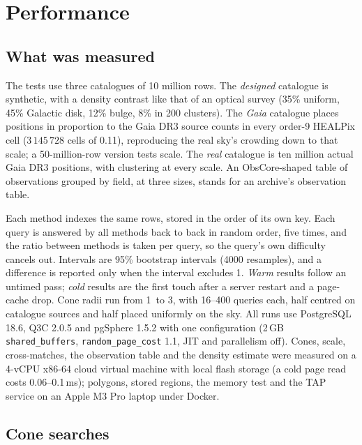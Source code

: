 \section{Performance}
\label{sec:tests}

\subsection{What was measured}
\label{sec:corpora}
\label{sec:protocol}

The tests use three catalogues of 10 million rows. The \emph{designed} catalogue is synthetic, with a density contrast like that of an
optical survey (35\% uniform, 45\% Galactic disk, 12\% bulge, 8\% in 200 clusters). The
\emph{Gaia} catalogue places positions in proportion to the Gaia DR3 source counts in
every order-9 HEALPix cell ($3\,145\,728$ cells of 0.11\degr), reproducing the real
sky's crowding down to that scale; a 50-million-row version tests scale. The \emph{real}
catalogue is ten million actual Gaia DR3 positions, with clustering at every scale. An
ObsCore-shaped table of observations grouped by field, at three sizes, stands for an
archive's observation table.

Each method indexes the same rows, stored in the order of its own key. Each query is
answered by all methods back to back in random order, five times, and the ratio between
methods is taken per query, so the query's own difficulty cancels out. Intervals are 95\% bootstrap intervals (4000
resamples), and a difference is reported only when the interval excludes 1. \emph{Warm}
results follow an untimed pass; \emph{cold} results are the first touch after a server
restart and a page-cache drop. Cone radii run from 1\arcsec\ to 3\degr, with 16--400
queries each, half centred on catalogue sources and half placed uniformly on the sky.
All runs use PostgreSQL 18.6, Q3C 2.0.5 and pgSphere 1.5.2 with one configuration
(2\,GB \texttt{shared\_buffers}, \texttt{random\_page\_cost} 1.1, JIT and parallelism
off). Cones, scale, cross-matches, the observation table and the density estimate were
measured on a 4-vCPU x86-64 cloud virtual machine with local flash storage (a cold page
read costs 0.06--0.1\,ms); polygons, stored regions, the memory test and the TAP service
on an Apple M3 Pro laptop under Docker.

\subsection{Cone searches}
\label{sec:cones}

